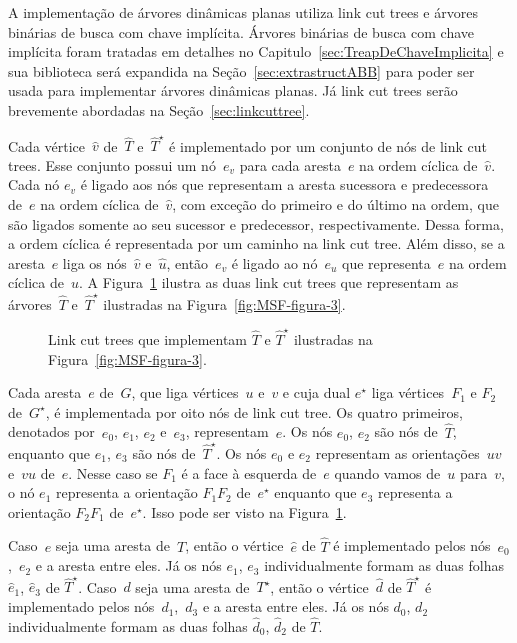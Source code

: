A implementação de árvores dinâmicas planas utiliza link cut trees e árvores binárias de busca com chave implícita.
Árvores binárias de busca com chave implícita foram tratadas em detalhes no Capitulo~\ref{sec:TreapDeChaveImplicita} e sua biblioteca será expandida na Seção~\ref{sec:extrastructABB} para poder ser usada para implementar árvores dinâmicas planas.
Já link cut trees serão brevemente abordadas na Seção~\ref{sec:linkcuttree}.

Cada vértice~$\hat v$ de~$\hat T$ e~$\hat T^\star$ é implementado por um conjunto de nós de link cut trees.
Esse conjunto possui um nó~$e_v$ para cada aresta~$e$ na ordem cíclica de~$\hat v$.
Cada nó $e_v$ é ligado aos nós que representam a aresta sucessora e predecessora de~$e$ na ordem cíclica de~$\hat v$,
com exceção do primeiro e do último na ordem, que são ligados somente ao seu sucessor e predecessor, respectivamente.
Dessa forma, a ordem cíclica é representada por um caminho na link cut tree.
Além disso, se a aresta~$e$ liga os nós~$\hat v$ e~$\hat u$, então~$e_v$ é ligado ao nó~$e_u$ que representa~$e$ na ordem cíclica de~$\hat u$.
A Figura~\ref{fig:MSF-figura-4} ilustra as duas link cut trees que representam as árvores~$\hat T$ e~$\hat T^\star$ ilustradas na Figura~\ref{fig:MSF-figura-3}.

\begin{figure}[htb]
\scalebox{1.3}{
\centering

}
\caption{Link cut trees que implementam $\hat T$ e $\hat T^\star$ ilustradas na Figura~\ref{fig:MSF-figura-3}.}
\label{fig:MSF-figura-4}
\end{figure}

Cada aresta~$e$ de~$G$, que liga vértices~$u$ e~$v$ e cuja dual $e^\star$ liga vértices~$F_1$ e $F_2$ de~$G^\star$, é implementada por oito nós de link cut tree.
Os quatro primeiros, denotados por~$e_0$, $e_1$, $e_2$ e~$e_3$, representam~$e$.
Os nós $e_0$, $e_2$ são nós de~$\hat T$, enquanto que $e_1$, $e_3$ são nós de~$\hat T^\star$.
Os nós $e_0$ e $e_2$ representam as orientações~$uv$ e~$vu$ de~$e$.
Nesse caso se $F_1$ é a face à esquerda de~$e$ quando vamos de~$u$ para~$v$, o nó $e_1$ representa a orientação $F_1F_2$ de~$e^\star$ enquanto que $e_3$ representa a orientação $F_2F_1$ de~$e^\star$.
Isso pode ser visto na Figura~\ref{fig:MSF-figura-4}.

Caso~$e$ seja uma aresta de~$T$, então o vértice~$\hat e$ de $\hat T$ é implementado pelos nós~$e_0$,~$e_2$ e a aresta entre eles.
Já os nós $e_1$, $e_3$ individualmente formam as duas folhas $\hat e_1$, $\hat e_3$ de $\hat T^\star$.
Caso~$d$ seja uma aresta de~$T^\star$, então o vértice~$\hat d$ de $\hat T^\star$ é implementado pelos nós~$d_1$,~$d_3$ e a aresta entre eles.
Já os nós $d_0$, $d_2$ individualmente formam as duas folhas $\hat d_0$, $\hat d_2$ de $\hat T$.

